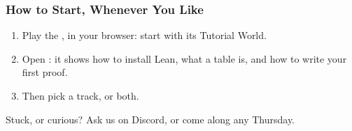 \documentclass{ltx-talk}
\begin{document}
\begin{frame}
  \frametitle{How to Start, Whenever You Like}
  \begin{enumerate}
    \item Play the , in your browser: start with its Tutorial
      World.
    \item Open : it shows how to install Lean, what a table
      is, and how to write your first proof.
    \item Then pick a track, or both.
  \end{enumerate}
  \begin{sticky}[halign = center]
    Stuck, or curious? Ask us on Discord, or come along any Thursday.
  \end{sticky}
\end{frame}
\end{document}
